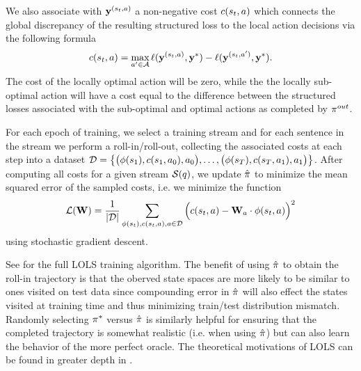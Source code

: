 We also associate with $\mathbf{y}^{(s_t, a)}$
a non-negative cost $c(s_t, a)$ which connects 
the global discrepancy of the resulting structured loss to the local action
decisions via the following formula
\[
    c(s_t, a) = 
      \max_{a^\prime \in \mathcal{A}}
        \ell(
            \mathbf{y}^{(s_t, a)},
            \mathbf{y}^*)
        - 
        \ell(
            \mathbf{y}^{(s_t, a^\prime)},
            \mathbf{y}^*).
\]
The cost of the locally optimal action will be zero, while the 
the locally sub-optimal action will have a cost equal to the difference
between the structured losses associated with the sub-optimal and optimal 
actions as completed by $\pi^{out}$.

For each epoch of training, we select a training stream and for 
each sentence in the stream we perform a roll-in/roll-out, collecting
the associated costs at each step into a dataset
$\mathcal{D} = \big\{\big(\phi(s_1), c(s_1, a_0), a_0\big), \ldots,
\big(\phi(s_T), c(s_T, a_1), a_1\big) \big\}$.
After computing all costs for a given
stream $\mathcal{S}(q)$, we update $\hat{\pi}$ to minimize the mean
squared error of the sampled costs, i.e. we minimize the function
\[ 
    \mathcal{L}(\mathbf{W}) =
    \frac{1}{|\mathcal{D}|} \sum_{\phi(s_t), c(s_t, a), a \in \mathcal{D}}  
\Big( c(s_t, a) -  \mathbf{W}_{a} \cdot \phi(s_t, a) \Big)^2 \]
using stochastic gradient descent. 

%

See \cite{kedzie2016real} for the full LOLS training algorithm.
The benefit of using $\hat{\pi}$ to obtain the roll-in trajectory 
is that the oberved state spaces are more likely to be similar to ones visited
on test data since compounding error in $\hat{\pi}$ will also effect the 
states visited at training 
time and thus minimizing train/test distribution mismatch. 
Randomly selecting $\pi^{*}$ versus $\hat{\pi}$ is similarly 
helpful for ensuring that the completed trajectory is somewhat realistic
(i.e. when using $\hat{\pi}$) but can also learn the behavior 
of the more perfect oracle. The theoretical motivations of LOLS can be found
in greater depth in \cite{chang2015learning}.


